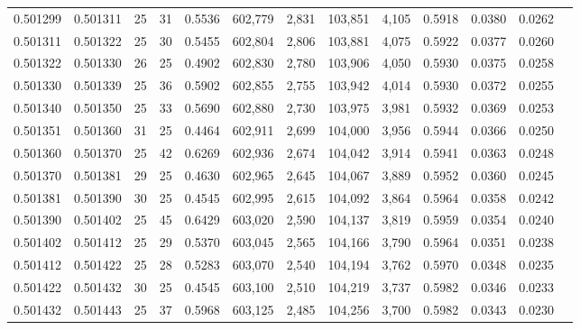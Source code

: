 \begin{tabular}{rrrrrrrrrrrrr}
0.501299 & 0.501311 &    25 &  31 &                                     0.5536 & 602,779 &   2,831 & 103,851 &   4,105 & 0.5918 & 0.0380 & 0.0262 \\
0.501311 & 0.501322 &    25 &  30 &                                     0.5455 & 602,804 &   2,806 & 103,881 &   4,075 & 0.5922 & 0.0377 & 0.0260 \\
0.501322 & 0.501330 &    26 &  25 &                                     0.4902 & 602,830 &   2,780 & 103,906 &   4,050 & 0.5930 & 0.0375 & 0.0258 \\
0.501330 & 0.501339 &    25 &  36 &                                     0.5902 & 602,855 &   2,755 & 103,942 &   4,014 & 0.5930 & 0.0372 & 0.0255 \\
0.501340 & 0.501350 &    25 &  33 &                                     0.5690 & 602,880 &   2,730 & 103,975 &   3,981 & 0.5932 & 0.0369 & 0.0253 \\
0.501351 & 0.501360 &    31 &  25 &                                     0.4464 & 602,911 &   2,699 & 104,000 &   3,956 & 0.5944 & 0.0366 & 0.0250 \\
0.501360 & 0.501370 &    25 &  42 &                                     0.6269 & 602,936 &   2,674 & 104,042 &   3,914 & 0.5941 & 0.0363 & 0.0248 \\
0.501370 & 0.501381 &    29 &  25 &                                     0.4630 & 602,965 &   2,645 & 104,067 &   3,889 & 0.5952 & 0.0360 & 0.0245 \\
0.501381 & 0.501390 &    30 &  25 &                                     0.4545 & 602,995 &   2,615 & 104,092 &   3,864 & 0.5964 & 0.0358 & 0.0242 \\
0.501390 & 0.501402 &    25 &  45 &                                     0.6429 & 603,020 &   2,590 & 104,137 &   3,819 & 0.5959 & 0.0354 & 0.0240 \\
0.501402 & 0.501412 &    25 &  29 &                                     0.5370 & 603,045 &   2,565 & 104,166 &   3,790 & 0.5964 & 0.0351 & 0.0238 \\
0.501412 & 0.501422 &    25 &  28 &                                     0.5283 & 603,070 &   2,540 & 104,194 &   3,762 & 0.5970 & 0.0348 & 0.0235 \\
0.501422 & 0.501432 &    30 &  25 &                                     0.4545 & 603,100 &   2,510 & 104,219 &   3,737 & 0.5982 & 0.0346 & 0.0233 \\
0.501432 & 0.501443 &    25 &  37 &                                     0.5968 & 603,125 &   2,485 & 104,256 &   3,700 & 0.5982 & 0.0343 & 0.0230 \\

\end{tabular}
